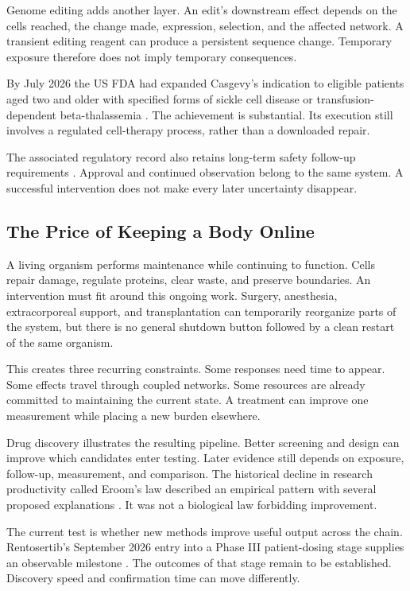 \documentclass[11pt,openany]{book}
\begin{document}
Genome editing adds another layer. An edit's downstream effect depends on the cells reached, the change made, expression, selection, and the affected network. A transient editing reagent can produce a persistent sequence change. Temporary exposure therefore does not imply temporary consequences.

By July 2026 the US FDA had expanded Casgevy's indication to eligible patients aged two and older with specified forms of sickle cell disease or transfusion-dependent beta-thalassemia \cite{fda2026casgevy}. The achievement is substantial. Its execution still involves a regulated cell-therapy process, rather than a downloaded repair.

The associated regulatory record also retains long-term safety follow-up requirements \cite{fda2026casgevyletter}. Approval and continued observation belong to the same system. A successful intervention does not make every later uncertainty disappear.

\subsection{The Price of Keeping a Body Online}

A living organism performs maintenance while continuing to function. Cells repair damage, regulate proteins, clear waste, and preserve boundaries. An intervention must fit around this ongoing work. Surgery, anesthesia, extracorporeal support, and transplantation can temporarily reorganize parts of the system, but there is no general shutdown button followed by a clean restart of the same organism.

This creates three recurring constraints. Some responses need time to appear. Some effects travel through coupled networks. Some resources are already committed to maintaining the current state. A treatment can improve one measurement while placing a new burden elsewhere.

Drug discovery illustrates the resulting pipeline. Better screening and design can improve which candidates enter testing. Later evidence still depends on exposure, follow-up, measurement, and comparison. The historical decline in research productivity called Eroom's law described an empirical pattern with several proposed explanations \cite{scannell2012diagnosing}. It was not a biological law forbidding improvement.

The current test is whether new methods improve useful output across the chain. Rentosertib's September 2026 entry into a Phase III patient-dosing stage supplies an observable milestone \cite{insilico2026phase3}. The outcomes of that stage remain to be established. Discovery speed and confirmation time can move differently.
\end{document}
